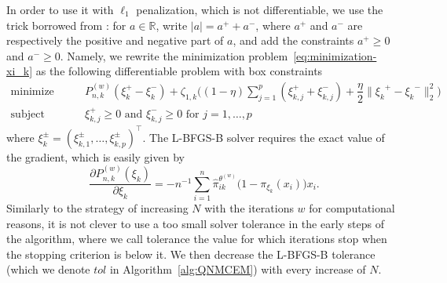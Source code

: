 \documentclass[11pt]{article}
\newcommand{\norm}[1]{\|#1\|}
\newcommand{\R}{\mathds R}
\begin{document}
In order to use it with $\ell_1$ penalization, which is not differentiable, we use the trick borrowed from \citet{andrew2007scalable}: for $a \in \R$, write $|a| = a^+ + a^-$, where $a^+$ and $a^-$ are respectively the positive and negative part of $a$, and add the constraints $a^+ \geq 0$ and $a^- \geq 0$.
Namely, we rewrite the minimization problem~\eqref{eq:minimization-xi_k} as the following differentiable problem with box constraints
\begin{equation}
  \label{eq:sub-problem-xi_k}
  \begin{split}
    \text{minimize}& \quad \quad P_{n, k}^{(w)}(\xi_k^+ - \xi_k^-) + \zeta_{1,k} \big((1 - \eta) \sum_{j=1}^p (\xi_{k,j}^+ + \xi_{k,j}^-) + \dfrac \eta 2 \norm{{\xi_k}^+ - {\xi_k}^-}_2^2 \big) \\
    \text{subject to}& \quad \quad \xi_{k,j}^+ \geq 0 \text{ and } \xi_{k,j}^- \geq 0 \text{ for } j = 1, \ldots, p
  \end{split} 
\end{equation}
where $\xi_k^\pm = (\xi_{k,1}^\pm, \ldots, \xi_{k,p}^\pm)^\top$. The L-BFGS-B solver requires the exact value of the gradient, which is easily given by
\begin{equation}
  \label{eq:grad-xi_k}
  \frac{\partial P_{n,k}^{(w)}(\xi_k)}{\partial \xi_k} = -n^{-1} \sum_{i=1}^n \hat \pi_{ik}^{\theta^{(w)}} \big( 1 - \pi_{\xi_k}(x_i) \big) x_i.
\end{equation}
Similarly to the strategy of increasing $N$ with the iterations $w$ for computational reasons, it is not clever to use a too small solver tolerance in the early steps of the algorithm, where we call tolerance the value for which iterations stop when the stopping criterion is below it. We then decrease the L-BFGS-B tolerance (which we denote $tol$ in Algorithm~\ref{alg:QNMCEM}) with every increase of $N$.
\end{document}
